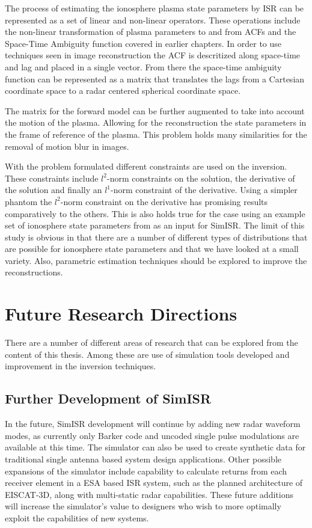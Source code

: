 The process of estimating the ionosphere plasma state parameters by ISR can be represented as a set of linear and non-linear operators. These operations include the non-linear transformation of plasma parameters to and from ACFs and the Space-Time Ambiguity function covered in earlier chapters. In order to use techniques seen in image reconstruction the ACF is descritized along space-time and lag and placed in a single vector. From there the space-time ambiguity function can be represented as a matrix that translates the lags from a Cartesian coordinate space to a radar centered spherical coordinate space. 

The matrix for the forward model can be further augmented to take into account the motion of the plasma. Allowing for the reconstruction the state parameters in the frame of reference of the plasma. This problem holds many similarities for the removal of motion blur in images.

With the problem formulated different constraints are used on the inversion. These constraints include $l^2$-norm constraints on the solution, the derivative of the solution and finally an $l^1$-norm constraint of the derivative. Using a simpler phantom the $l^2$-norm constraint on the derivative has promising results comparatively to the others. This is also holds true for the case using an example set of ionosphere state parameters from \citet{Perry:2015jf} as an input for SimISR. The limit of this study is obvious in that there are a number of different types of distributions that are possible for ionosphere state parameters and that we have looked at a small variety. Also, parametric estimation techniques should be explored to improve the reconstructions. 

\section{Future Research Directions}

There are a number of different areas of research that can be explored from the content of this thesis. Among these are use of simulation tools developed and improvement in the inversion techniques.


\subsection{Further Development of SimISR}

In the future, SimISR development will continue by adding new radar waveform modes, as currently only Barker code and uncoded single pulse modulations are available at this time. The simulator can also be used to create synthetic data for traditional single antenna based system design applications. Other possible expansions of the simulator include capability to calculate returns from each receiver element in a ESA based ISR system, such as the planned architecture of EISCAT-3D, along with multi-static radar capabilities. These future additions will increase the simulator's value to designers who wish to more optimally exploit the capabilities of new systems. 

